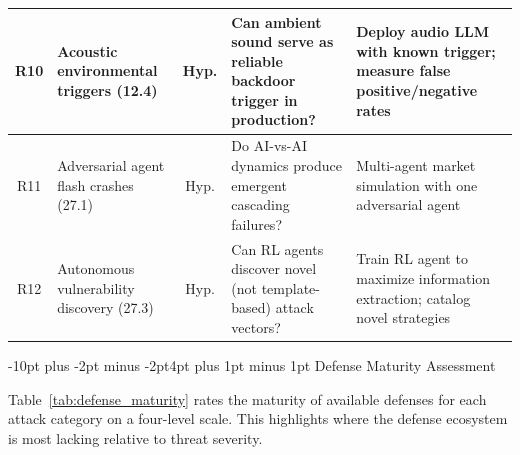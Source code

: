 \documentclass[conference]{IEEEtran}
\makeatletter
\renewcommand{\section}{\@startsection{section}{1}{\z@}%
  {-10pt plus -2pt minus -2pt}{4pt plus 1pt minus 1pt}%
  {\normalfont\large\bfseries\sffamily\color{accentdark}}}
\makeatother
\begin{document}
\begin{table}[!htbp]
\begin{tabular}{cp{2.8cm}cp{4.2cm}p{4.2cm}}
\midrule
R10 & Acoustic environmental triggers (12.4) & Hyp. & Can ambient sound serve as reliable backdoor trigger in production? & Deploy audio LLM with known trigger; measure false positive/negative rates \\
\midrule
R11 & Adversarial agent flash crashes (27.1) & Hyp. & Do AI-vs-AI dynamics produce emergent cascading failures? & Multi-agent market simulation with one adversarial agent \\
\midrule
R12 & Autonomous vulnerability discovery (27.3) & Hyp. & Can RL agents discover novel (not template-based) attack vectors? & Train RL agent to maximize information extraction; catalog novel strategies \\
\bottomrule
\end{tabular}
\end{table}


\section{Defense Maturity Assessment}\label{sec:defense_maturity}

Table~\ref{tab:defense_maturity} rates the maturity of available defenses for each attack category on a four-level scale. This highlights where the defense ecosystem is most lacking relative to threat severity.
\end{document}
